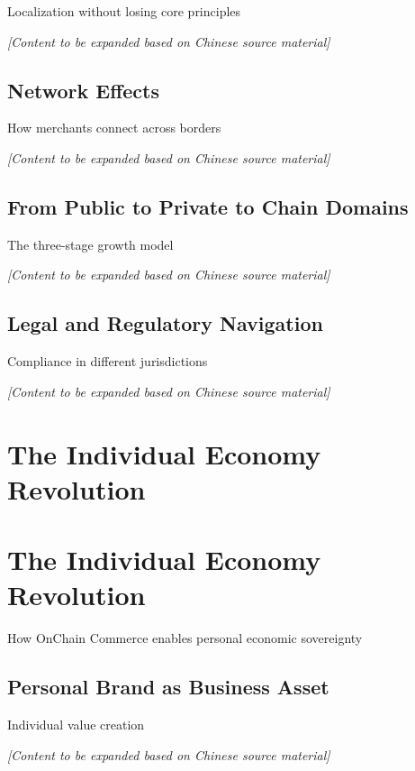 \documentclass[
  Letterpaper,
]{scrbook}
\begin{document}
Localization without losing core principles

\emph{{[}Content to be expanded based on Chinese source material{]}}

\section{Network Effects}\label{network-effects}

How merchants connect across borders

\emph{{[}Content to be expanded based on Chinese source material{]}}

\section{From Public to Private to Chain
Domains}\label{from-public-to-private-to-chain-domains}

The three-stage growth model

\emph{{[}Content to be expanded based on Chinese source material{]}}

\section{Legal and Regulatory
Navigation}\label{legal-and-regulatory-navigation}

Compliance in different jurisdictions

\emph{{[}Content to be expanded based on Chinese source material{]}}

\chapter{The Individual Economy
Revolution}\label{the-individual-economy-revolution}

\chapter{The Individual Economy
Revolution}\label{sec-individual-economy}

How OnChain Commerce enables personal economic sovereignty

\section{Personal Brand as Business
Asset}\label{personal-brand-as-business-asset}

Individual value creation

\emph{{[}Content to be expanded based on Chinese source material{]}}
\end{document}
